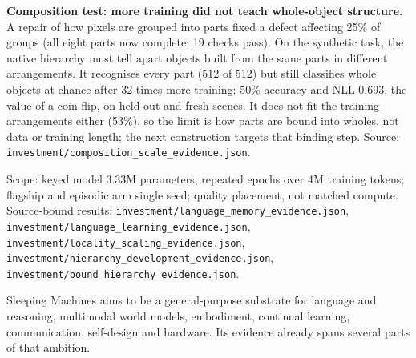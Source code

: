 \documentclass[10pt, a4 paper]{article}
\newcommand{\sect}[2]{\vspace{2pt}{\color{ours}\footnotesize\bfseries\MakeUppercase{#1}}\par\vspace{-3pt}{\LARGE\bfseries #2}\par\vspace{2pt}}
\begin{document}
{\small \textbf{Composition test: more training did not teach whole-object structure.} A repair of how pixels are grouped into parts fixed a defect affecting 25\% of groups (all eight parts now complete; 19 checks pass). On the synthetic task, the native hierarchy must tell apart objects built from the same parts in different arrangements. It recognises every part (512 of 512) but still classifies whole objects at chance after 32 times more training: 50\% accuracy and NLL 0.693, the value of a coin flip, on held-out and fresh scenes. It does not fit the training arrangements either (53\%), so the limit is how parts are bound into wholes, not data or training length; the next construction targets that binding step. Source: \texttt{investment/composition\_scale\_evidence.json}.}

\begin{center}
\end{center}



{\footnotesize\color{muted}Scope: keyed model 3.33M parameters, repeated epochs over 4M training tokens; flagship and
episodic arm single seed; quality placement, not matched compute. Source-bound results:
\texttt{investment/language\_memory\_evidence.json}, \texttt{investment/language\_learning\_evidence.json},
\texttt{investment/locality\_scaling\_evidence.json},
\texttt{investment/hierarchy\_development\_evidence.json}, \texttt{investment/bound\_hierarchy\_evidence.json}.}

\newpage
\sect{What the evidence adds up to}{A proven prediction engine and a developing learning engine}

Sleeping Machines aims to be a general-purpose substrate for language and
reasoning, multimodal world models, embodiment, continual learning,
communication, self-design and hardware. Its evidence already spans several
parts of that ambition.
\end{document}
